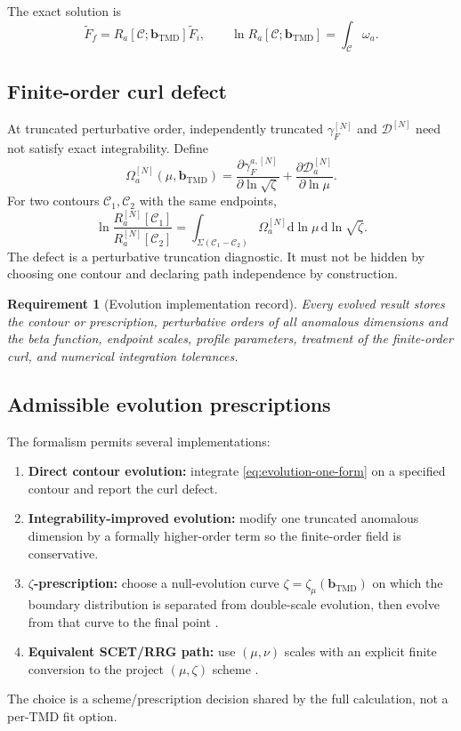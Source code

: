 \documentclass[11pt]{article}
\newtheorem{requirement}[definition]{Requirement}
\newcommand{\bM}{\bm{b}_{\mathrm{TMD}}}
\newcommand{\dd}{\mathrm{d}}
\newcommand{\cC}{\mathcal C}
\newcommand{\cD}{\mathcal D}
\begin{document}
The exact solution is
\begin{equation}
 \widetilde F_f
 =R_a[\cC;\bM]
 \widetilde F_i,
 \qquad
 \ln R_a[\cC;\bM]
 =\int_{\cC}\omega_a.
 \label{eq:contour-evolution-factor}
\end{equation}

\subsection{Finite-order curl defect}

At truncated perturbative order, independently truncated
\(\gamma_F^{[N]}\) and \(\cD^{[N]}\) need not satisfy exact integrability.
Define
\begin{equation}
 \Omega_a^{[N]}(\mu,\bM)
 =
 \frac{\partial\gamma_F^{a,[N]}}{\partial\ln\sqrt\zeta}
 +
 \frac{\partial\cD_a^{[N]}}{\partial\ln\mu}.
 \label{eq:finite-order-curl}
\end{equation}
For two contours \(\cC_1,\cC_2\) with the same endpoints,
\begin{equation}
 \ln\frac{R_a^{[N]}[\cC_1]}{R_a^{[N]}[\cC_2]}
 =\int_{\Sigma(\cC_1-\cC_2)}
 \Omega_a^{[N]}
 \dd\ln\mu\,\dd\ln\sqrt\zeta.
 \label{eq:contour-defect}
\end{equation}
The defect is a perturbative truncation diagnostic.  It must not be hidden by
choosing one contour and declaring path independence by construction.

\begin{requirement}[Evolution implementation record]
Every evolved result stores the contour or prescription, perturbative orders
of all anomalous dimensions and the beta function, endpoint scales, profile
parameters, treatment of the finite-order curl, and numerical integration
tolerances.
\end{requirement}

\subsection{Admissible evolution prescriptions}

The formalism permits several implementations:
\begin{enumerate}
\item \textbf{Direct contour evolution:} integrate \cref{eq:evolution-one-form}
      on a specified contour and report the curl defect.
\item \textbf{Integrability-improved evolution:} modify one truncated
      anomalous dimension by a formally higher-order term so the finite-order
      field is conservative.
\item \textbf{\(\zeta\)-prescription:} choose a null-evolution curve
      \(\zeta=\zeta_\mu(\bM)\) on which the boundary distribution is separated
      from double-scale evolution, then evolve from that curve to the final
      point \cite{ScimemiVladimirov2017,ScimemiVladimirov2018}.
\item \textbf{Equivalent SCET/RRG path:} use \((\mu,\nu)\) scales with an
      explicit finite conversion to the project \((\mu,\zeta)\) scheme
      \cite{Chiu2012}.
\end{enumerate}
The choice is a scheme/prescription decision shared by the full calculation,
not a per-TMD fit option.
\end{document}
